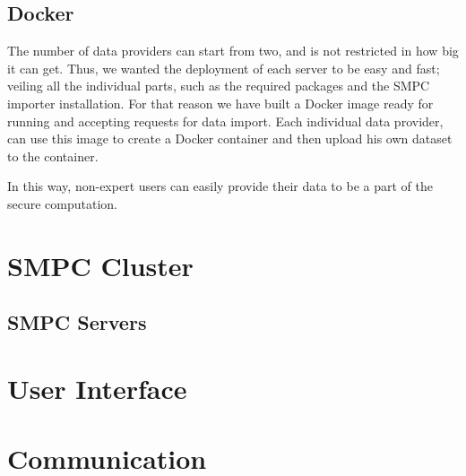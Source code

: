 \subsection{Docker}\label{ss:data-providers-docker}
The number of data providers can start from two, and is not restricted in how big it can get.
Thus, we wanted the deployment of each server to be easy and fast; veiling all the individual parts, such as the required packages and the SMPC importer installation.
For that reason we have built a Docker image ready for running and accepting requests for data import.
Each individual data provider, can use this image to create a Docker container and then upload his own dataset to the container.

In this way, non-expert users can easily provide their data to be a part of the secure computation.



\section{SMPC Cluster}\label{s:impl-smpc-cluster}

\subsection{SMPC Servers}\label{ss:smpc-cluster-servers}





\section{User Interface}\label{s:impl-ui}




\section{Communication}\label{s:impl-communication}


